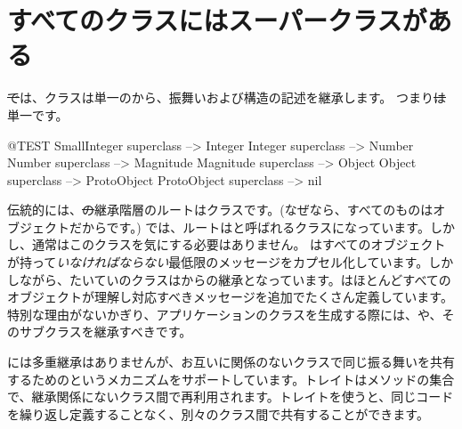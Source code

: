 \documentclass[a4paper,10pt,twoside]{book}
\begin{document}
\section{すべてのクラスにはスーパークラスがある}


\st では、クラスは単一のから、振舞いおよび構造の記述を継承します。
つまり\st は単一です。

\begin{code}{@TEST}
SmallInteger superclass --> Integer
Integer superclass          --> Number
Number superclass        --> Magnitude
Magnitude superclass    --> Object
Object superclass           --> ProtoObject
ProtoObject superclass  --> nil
\end{code}

伝統的には、\st の継承階層のルートはクラスです。(なぜなら、すべてのものはオブジェクトだからです。)
\pharo では、ルートはと呼ばれるクラスになっています。しかし、通常はこのクラスを気にする必要はありません。 はすべてのオブジェクトが持って\emph{いなければならない}最低限のメッセージをカプセル化しています。しかしながら、たいていのクラスはからの継承となっています。はほとんどすべてのオブジェクトが理解し対応すべきメッセージを追加でたくさん定義しています。特別な理由がないかぎり、アプリケーションのクラスを生成する際には、や、そのサブクラスを継承すべきです。



\pharo には多重継承はありませんが、お互いに関係のないクラスで同じ振る舞いを共有するためのというメカニズムをサポートしています。トレイトはメソッドの集合で、継承関係にないクラス間で再利用されます。トレイトを使うと、同じコードを繰り返し定義することなく、別々のクラス間で共有することができます。

\end{document}
